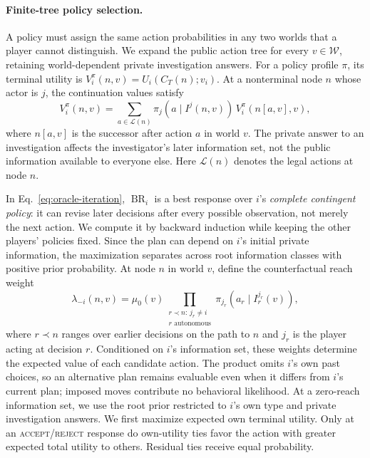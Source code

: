 \paragraph{Finite-tree policy selection.}
A policy must assign the same action probabilities in any two worlds that a
player cannot distinguish. We expand the public action tree for every
$v\in\mathcal W$, retaining world-dependent private investigation answers.
For a policy profile $\pi$, its terminal utility is
$V_i^\pi(n,v)=U_i(C_T(n);v_i)$. At a nonterminal node $n$ whose actor is $j$,
the continuation values satisfy
\begin{equation}
 V_i^\pi(n,v)=
 \sum_{a\in\mathcal L(n)}
 \pi_j(a\mid I^j(n,v))\,V_i^\pi(n[a,v],v),
 \label{eq:oracle-tree-recursion}
\end{equation}
where $n[a,v]$ is the successor after action $a$ in world $v$. The private
answer to an investigation affects the investigator's later information set,
not the public information available to everyone else. Here
$\mathcal L(n)$ denotes the legal actions at node $n$.

In Eq.~\ref{eq:oracle-iteration}, $\operatorname{BR}_i$ is a best response
over $i$'s \emph{complete contingent policy}: it can revise later decisions
after every possible observation, not merely the next action. We compute it
by backward induction while keeping the other players' policies fixed. Since
the plan can depend on $i$'s initial private information, the maximization
separates across root information classes with positive prior probability.
At node $n$ in world $v$, define the counterfactual reach weight
\begin{equation}
 \lambda_{-i}(n,v)=\mu_0(v)
 \prod_{\substack{r\prec n:\,j_r\ne i\\r\text{ autonomous}}}
 \pi_{j_r}(a_r\mid I_r^{j_r}(v)),
 \label{eq:oracle-reach}
\end{equation}
where $r\prec n$ ranges over earlier decisions on the path to $n$ and $j_r$
is the player acting at decision $r$.
Conditioned on $i$'s information set, these weights determine the expected
value of each candidate action. The product omits $i$'s own past choices, so
an alternative plan remains evaluable even when it differs from $i$'s current
plan; imposed moves contribute no behavioral likelihood. At a zero-reach
information set, we use the root prior restricted to $i$'s own type and
private investigation answers. We first maximize expected own terminal
utility. Only at an \textsc{accept}/\textsc{reject} response do own-utility
ties favor the action with greater expected total utility to others.
Residual ties receive equal probability.

